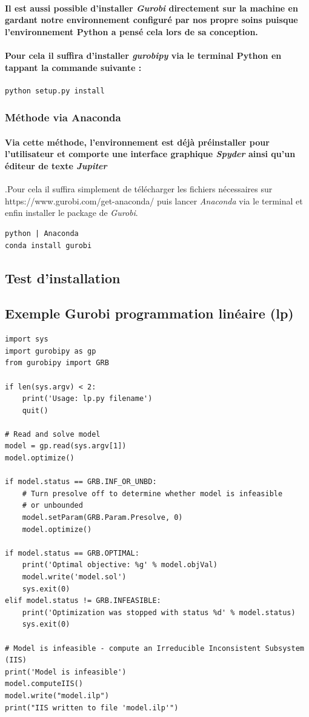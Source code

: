 \documentclass[a4paper, 12pt, twoside]{article}
\begin{document}
\paragraph{Il est aussi possible d'installer \textit{Gurobi} directement sur la machine en gardant notre environnement configuré par nos propre soins puisque l'environnement Python a pensé cela lors de sa conception.}
\paragraph{Pour cela il suffira d'installer \textit{gurobipy} via le terminal Python en tappant la commande suivante :}
\begin{verbatim}
python setup.py install
\end{verbatim}

\subsubsection{Méthode via Anaconda }
\paragraph{Via cette méthode, l'environnement est déjà préinstaller pour l'utilisateur et comporte une interface graphique \textit{Spyder} ainsi qu'un éditeur de texte \textit{Jupiter}}.Pour cela il suffira simplement de télécharger les fichiers nécessaires sur https://www.gurobi.com/get-anaconda/ puis lancer  \textit{Anaconda} via le terminal et enfin installer le package de \textit{Gurobi}.

\begin{verbatim}
python | Anaconda
conda install gurobi 
\end{verbatim}
\subsection{Test d'installation}
\subsection{Exemple Gurobi programmation linéaire (lp)}
\begin{verbatim}
import sys
import gurobipy as gp
from gurobipy import GRB

if len(sys.argv) < 2:
    print('Usage: lp.py filename')
    quit()

# Read and solve model
model = gp.read(sys.argv[1])
model.optimize()

if model.status == GRB.INF_OR_UNBD:
    # Turn presolve off to determine whether model is infeasible
    # or unbounded
    model.setParam(GRB.Param.Presolve, 0)
    model.optimize()

if model.status == GRB.OPTIMAL:
    print('Optimal objective: %g' % model.objVal)
    model.write('model.sol')
    sys.exit(0)
elif model.status != GRB.INFEASIBLE:
    print('Optimization was stopped with status %d' % model.status)
    sys.exit(0)

# Model is infeasible - compute an Irreducible Inconsistent Subsystem (IIS)
print('Model is infeasible')
model.computeIIS()
model.write("model.ilp")
print("IIS written to file 'model.ilp'")
\end{verbatim}
\end{document}
